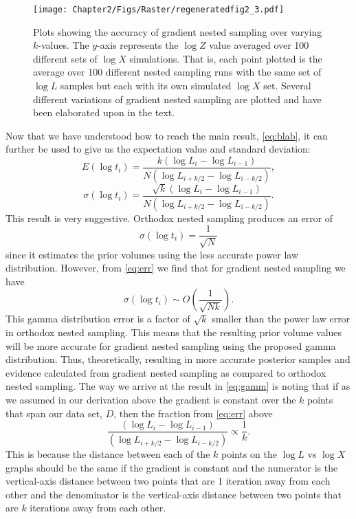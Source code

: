 \begin{figure} 
\centering    
\texttt{[image: Chapter2/Figs/Raster/regeneratedfig2\_3.pdf]}
\caption{ Plots showing the accuracy of gradient nested sampling over varying $k$-values. The $y$-axis represents the $\log Z$ value averaged over 100 different sets of $\log X$ simulations. That is, each point plotted is the average over 100 different nested sampling runs with the same set of $\log L$ samples but each with its own simulated $\log X$ set. Several different variations of gradient nested sampling are plotted and have been elaborated upon in the text.}
\label{fig:loglolol}
\end{figure}

Now that we have understood how to reach the main result, \cref{eq:blab}, it can further be used to give us the expectation value and standard deviation:
%
\begin{equation}
  E(\log t_i)=  \frac{k(\log L_i-\log L_{i-1})}{N(\log L_{i+k/2}-\log L_{i-k/2})}, 
\label{eq:mean}
\end{equation}
%
\begin{equation}
  \sigma(\log t_i)=  \frac{\sqrt{k}(\log L_i-\log L_{i-1})}{N(\log L_{i+k/2}-\log L_{i-k/2})}.  
\label{eq:err}
\end{equation}
%
This result is very suggestive. Orthodox nested sampling produces an error of 
%
\begin{equation}
    \sigma(\log t_i)= \frac{1}{\sqrt{N}}
\end{equation}
%
since it estimates the prior volumes using the less accurate power law distribution. However, from \cref{eq:err} we find that for gradient nested sampling we have
%
\begin{equation}
  \sigma(\log t_i) \sim O(\frac{1}{ \sqrt{Nk}}). 
\label{eq:gamm}
\end{equation}
%
This gamma distribution error is a factor of $\sqrt{k}$ smaller than the power law error in orthodox nested sampling. This means that the resulting prior volume values will be more accurate for gradient nested sampling using the proposed gamma distribution. Thus, theoretically, resulting in more accurate posterior samples and evidence calculated from gradient nested sampling as compared to orthodox nested sampling. 
The way we arrive at the result in \cref{eq:gamm} is noting that if as we assumed in our derivation above the gradient is constant over the $k$ points that span our data set, $D$, then the fraction from \cref{eq:err} above
%
\begin{equation}
\frac{(\log L_i-\log L_{i-1})}{(\log L_{i+k/2}-\log L_{i-k/2})}   \propto \frac{1}{k}. 
\end{equation}
%
This is because the distance between each of the $k$ points on the $\log L$ vs $\log X$ graphs should be the same if the gradient is constant and the numerator is the vertical-axis distance between two points that are 1 iteration away from each other and the denominator is the vertical-axis distance between two points that are $k$ iterations away from each other.





